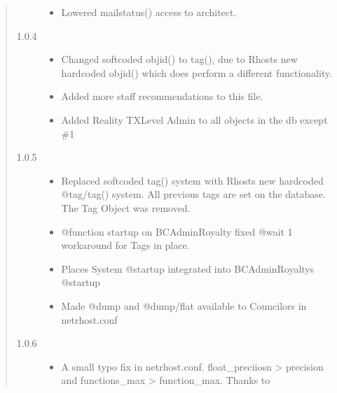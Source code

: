 \documentclass[letterpaper,10pt,english]{sphinxmanual}
\begin{document}
\begin{quote}
\begin{description}
\begin{itemize}
\item {} 
\sphinxAtStartPar
Lowered mailstatus() access to architect.

\end{itemize}

\item[{1.0.4}] \leavevmode\begin{itemize}
\item {} 
\sphinxAtStartPar
Changed softcoded objid() to tag(), due to Rhost\textquotesingle{}s new hardcoded
objid() which does perform a different functionality.

\item {} 
\sphinxAtStartPar
Added more staff recommendations to this file.

\item {} 
\sphinxAtStartPar
Added Reality TXLevel \textquotesingle{}Admin\textquotesingle{} to all objects in the db except \#1

\end{itemize}

\item[{1.0.5}] \leavevmode\begin{itemize}
\item {} 
\sphinxAtStartPar
Replaced softcoded tag() system with Rhost\textquotesingle{}s new hardcoded @tag/tag()
system. All previous tags are set on the database. The Tag Object
was removed.

\item {} 
\sphinxAtStartPar
@function startup on BC\sphinxhyphen{}Admin\sphinxhyphen{}Royalty fixed \sphinxhyphen{} @wait 1 workaround for
Tags in place.

\item {} 
\sphinxAtStartPar
Places System @startup integrated into BC\sphinxhyphen{}Admin\sphinxhyphen{}Royalty\textquotesingle{}s @startup

\item {} 
\sphinxAtStartPar
Made @dump and @dump/flat available to Councilors in netrhost.conf

\end{itemize}

\item[{1.0.6}] \leavevmode\begin{itemize}
\item {} 
\sphinxAtStartPar
A small typo fix in netrhost.conf. float\_preciiosn \sphinxhyphen{}\textgreater{} precision and
functions\_max \sphinxhyphen{}\textgreater{} function\_max. Thanks to 

\end{itemize}

\end{description}
\end{quote}
\end{document}
